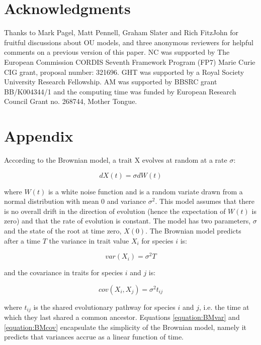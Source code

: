 \documentclass[a4paper,12pt]{article}
\begin{document}
\section{Acknowledgments}
  Thanks to Mark Pagel, Matt Pennell, Graham Slater and Rich FitzJohn for fruitful discussions about OU models, and three anonymous reviewers for helpful comments on a previous version of this paper. NC was supported by The European Commission CORDIS Seventh Framework Program (FP7) Marie Curie CIG grant, proposal number: 321696. GHT was supported by a Royal Society University Research Fellowship. AM was supported by BBSRC grant BB/K004344/1 and the computing time was funded by European Research Council Grant no. 268744, Mother Tongue.




\section{Appendix}
  \label{section:models}
  \setcounter{equation}{0}

  According to the Brownian model, a trait X evolves at random at a rate $\sigma$:

    \begin{equation}
      dX(t) = \sigma dW(t)
      \label{equation:BMrate} 
    \end{equation}

  where $W(t)$ is a white noise function and is a random variate drawn from a normal distribution with mean $0$ and variance $\sigma^2$. 
  This model assumes that there is no overall drift in the direction of evolution (hence the expectation of $W(t)$ is zero) and that the rate of evolution is constant. 
  The model has two parameters, $\sigma$ and the state of the root at time zero, $X(0)$. 
  The Brownian model predicts after a time $T$ the variance in trait value $X_i$ for species $i$ is:

    \begin{equation}
      var(X_i) = \sigma^2 T
      \label{equation:BMvar} 
    \end{equation}

  and the covariance in traits for species $i$ and $j$ is:
  
    \begin{equation}
      cov(X_i,X_j) = \sigma^2 t_{ij}
      \label{equation:BMcov} 
    \end{equation}

  where $t_{ij}$ is the shared evolutionary pathway for species $i$ and $j$, i.e. the time at which they last shared a common ancestor. 
  Equations \ref{equation:BMvar} and \ref{equation:BMcov} encapsulate the simplicity of the Brownian model, namely it predicts that variances accrue as a linear function of time. 
\end{document}
